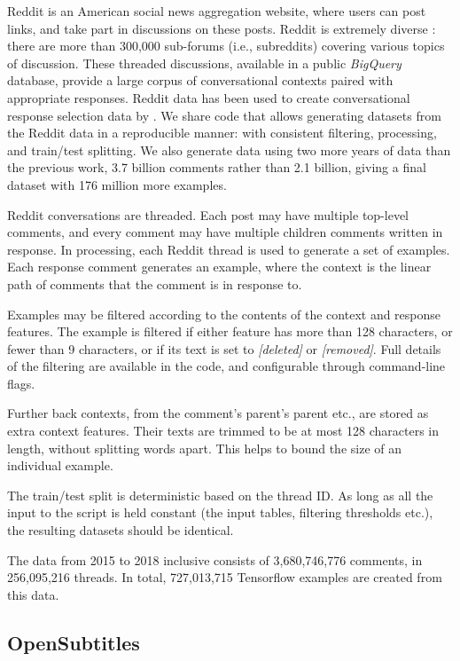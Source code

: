 \documentclass[11pt,a4paper,table]{article}
\begin{document}
Reddit is an American social news aggregation website, where users can post links, and take part in discussions on these posts. 
Reddit is extremely diverse \cite{Schrading:2015emnlp,AlRfou:2016arxiv}: there are more  than  300,000 sub-forums (i.e., subreddits) covering various topics of discussion. These threaded discussions, available in a public \emph{BigQuery} database,  provide a large corpus of conversational contexts paired with appropriate responses.  Reddit data has been used to create conversational response selection data by . We share code that allows generating datasets from the Reddit data in a reproducible manner: with consistent filtering, processing, and train/test splitting. We also generate data using two more years of data than the previous work, 3.7 billion comments rather than 2.1 billion, giving a final dataset with 176 million more examples.
 

Reddit conversations are threaded. Each post may have multiple top-level comments, and every comment may have multiple children comments written in response. In processing, each Reddit thread is used to generate a set of examples. Each response comment generates an example, where the context is the linear path of comments that the comment is in response to.

Examples may be filtered according to the contents of the context and response features. The example is filtered if either feature has more than 128 characters, or fewer than 9 characters, or if its text is set to \emph{[deleted]} or \emph{[removed]}. Full details of the filtering are available in the code, and configurable through command-line flags.

Further back contexts, from the comment's parent's parent etc., are stored as extra context features. Their texts are trimmed to be at most 128 characters in length, without splitting words apart. This helps to bound the size of an individual example.

The train/test split is deterministic based on the thread ID. As long as all the input to the script is held constant (the input tables, filtering thresholds etc.), the resulting datasets should be identical.

The data from 2015 to 2018 inclusive consists of 3,680,746,776 comments, in 256,095,216 threads. In total, 727,013,715 Tensorflow examples are created from this data.

\subsection{OpenSubtitles}
\end{document}
